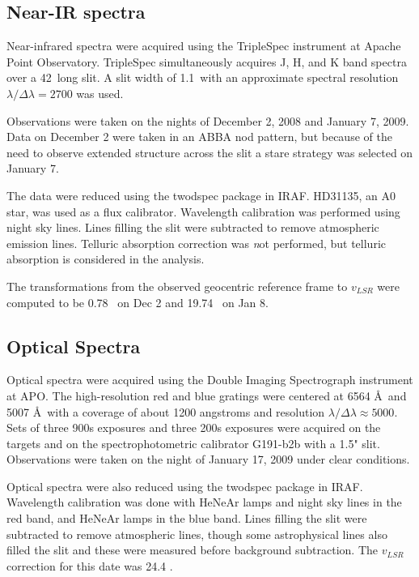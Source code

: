 \subsection{Near-IR spectra}
Near-infrared spectra were acquired using the TripleSpec instrument at Apache
Point Observatory.  TripleSpec simultaneously acquires J, H, and K band spectra
over a 42\arcsec\ long slit.  A slit width of 1.1\arcsec\ with an
approximate spectral resolution $\lambda/\Delta\lambda=2700$ was used.  

Observations were taken on the nights of December 2, 2008 and January 7, 2009.
Data on December 2 were taken in an ABBA nod pattern, but because of the need
to observe extended structure across the slit a stare strategy was selected on
January 7.  

The data were reduced using the {\sc twodspec} package in IRAF.  
HD31135, an A0 star, was used as a flux calibrator.  Wavelength calibration was
performed using night sky lines.  Lines filling the slit were subtracted
to remove atmospheric emission lines.  Telluric absorption correction was {\emph
not} performed, but telluric absorption is considered in the analysis.

The transformations from the observed geocentric reference frame to $v_{LSR}$ 
were computed to be 0.78 \kms\ on Dec 2 and 19.74 \kms\ on Jan 8.

\subsection{Optical Spectra}
Optical spectra were acquired using the Double Imaging Spectrograph instrument
at APO.  The high-resolution red and blue gratings
were centered at 6564 \AA\ and 5007 \AA\ with a coverage of about 1200 angstroms and
resolution $\lambda/\Delta\lambda \approx 5000$.  Sets of three 900s exposures
and three 200s exposures were acquired on the targets and on the spectrophotometric
calibrator G191-b2b with a 1.5" slit.  Observations were taken on the night
of January 17, 2009 under clear conditions.

Optical spectra were also reduced using the {\sc twodspec} package in IRAF.
Wavelength calibration was done with HeNeAr lamps and night sky lines
in the red band, and HeNeAr lamps in the blue band.  Lines filling the slit
were subtracted to remove atmospheric lines, though some astrophysical lines
also filled the slit and these were measured before background subtraction.
The $v_{LSR}$ correction for this date was 24.4 \kms.

